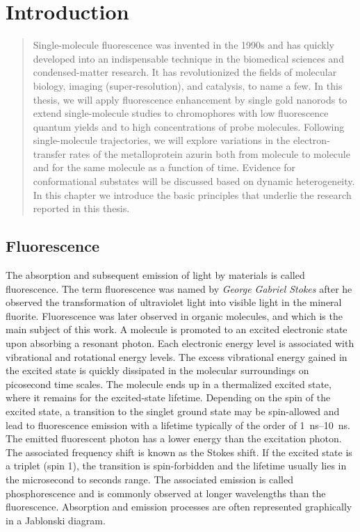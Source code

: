 \chapter{Introduction}
\label{chapter:intro}
\graphicspath{{./chapters/c1_intro/figures/}}
\begin{abstract}
	Single-molecule fluorescence was invented in the 1990s and has quickly developed into an indispensable technique in the biomedical sciences and condensed-matter research. It has revolutionized the fields of molecular biology, imaging (super-resolution), and catalysis, to name a few. In this thesis, we will apply fluorescence enhancement by single gold nanorods to extend single-molecule studies to chromophores with low fluorescence quantum yields and to high concentrations of probe molecules. Following single-molecule trajectories, we will explore variations in the electron-transfer rates of the metalloprotein azurin both from molecule to molecule and for the same molecule as a function of time. Evidence for conformational substates will be discussed based on dynamic heterogeneity. In this chapter we introduce the basic principles that underlie the research reported in this thesis.
\end{abstract}
\newpage
\section{Fluorescence}
The absorption and subsequent emission of light by materials is called fluorescence.
The term fluorescence was named by \textit{George Gabriel Stokes} after he observed the transformation of ultraviolet light into visible light in the mineral fluorite.\cite{Stokes1852} Fluorescence was later observed in organic molecules, and which is the main subject of this work.
A molecule is promoted to an excited electronic state upon absorbing a resonant photon.
Each electronic energy level is associated with vibrational and rotational energy levels.
The excess vibrational energy gained in the excited state is quickly dissipated in the molecular surroundings on picosecond time scales.
The molecule ends up in a thermalized excited state, where it remains for the excited-state lifetime.
Depending on the spin of the excited state, a transition to the singlet ground state may be spin-allowed and lead to fluorescence emission with a lifetime typically of the order of \SIrange{1}{10}{\ns}.
The emitted fluorescent photon has a lower energy than the excitation photon. The associated frequency shift is known as the Stokes shift.
If the excited state is a triplet (spin 1), the transition is spin-forbidden and the lifetime usually lies in the microsecond to seconds range.
The associated emission is called  phosphorescence and is commonly observed at longer wavelengths than the fluorescence.
Absorption and emission processes are often represented graphically in a Jablonski diagram.\cite{RohatgiMukherjee1979k,Lakowicz1999book}

